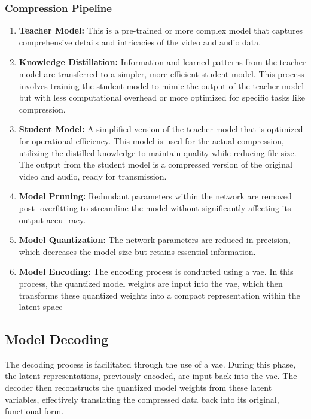 \documentclass{ioereport}
\begin{document}
        \subsubsection{Compression Pipeline}
        \begin{enumerate}[label=\textbf{\roman*.}]
          \item \textbf{Teacher Model:} This is a pre-trained or more complex model that captures comprehensive details and intricacies of the video and audio data.
          \item \textbf{Knowledge Distillation:} Information and learned patterns from the teacher model are transferred to a simpler, more efficient student model. This process involves training the student model to mimic the output of the teacher model but with less computational overhead or more optimized for specific tasks like compression.
          \item \textbf{Student Model:} A simplified version of the teacher model that is optimized for operational efficiency. This model is used for the actual compression, utilizing the distilled knowledge to maintain quality while reducing file size. The output from the student model is a compressed version of the original video and audio, ready for transmission.
          
        \item \textbf{Model Pruning:} Redundant parameters within the network are removed post- overfitting to streamline the model without significantly affecting its output accu- racy.
        \item \textbf{Model Quantization:} The network parameters are reduced in precision, which decreases the model size but retains essential information.
        \item \textbf{Model Encoding:} The encoding process is conducted using a \gls{vae}. In this process, the quantized model weights are input into the \gls{vae}, which then transforms these quantized weights into a compact representation within the latent space
    
        \end{enumerate}

        \subsection{Model Decoding}
        The decoding process is facilitated through the use of a \gls{vae}. During this phase, the latent representations, previously encoded, are input back into the \gls{vae}. The decoder then reconstructs the quantized model weights from these latent variables, effectively translating the compressed data back into its original, functional form.
\end{document}
